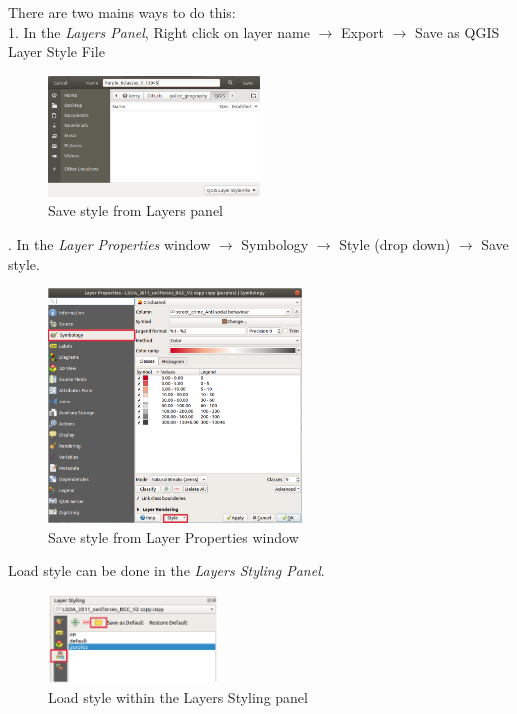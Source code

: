 There are two mains ways to do this:\\

1. In the \textit{Layers Panel}, Right click on layer name $\rightarrow$ Export $\rightarrow$ Save as QGIS Layer Style File

\begin{figure}[!h]
	\centering
	\includegraphics[width=0.5\textwidth]{images/save_as_qgis_layer_style_file.png}
	\caption{Save style from Layers panel}
	\label{ft_fig_firstfig3}
\end{figure}

\null{}. In the \textit{Layer Properties} window $\rightarrow$ Symbology $\rightarrow$ Style (drop down) $\rightarrow$ Save style.\\

\begin{figure}[!h]
	\centering
	\includegraphics[width=0.6\textwidth]{images/save_style.png}
	\caption{Save style from Layer Properties window}
	\label{ft_fig_firstfig3}
\end{figure}

Load style can be done in the \textit{Layers Styling Panel}.\\

\begin{figure}[!h]
	\centering
	\includegraphics[width=0.4\textwidth]{images/load_style.png}
	\caption{Load style within the Layers Styling panel}
	\label{ft_fig_firstfig3}
\end{figure}

